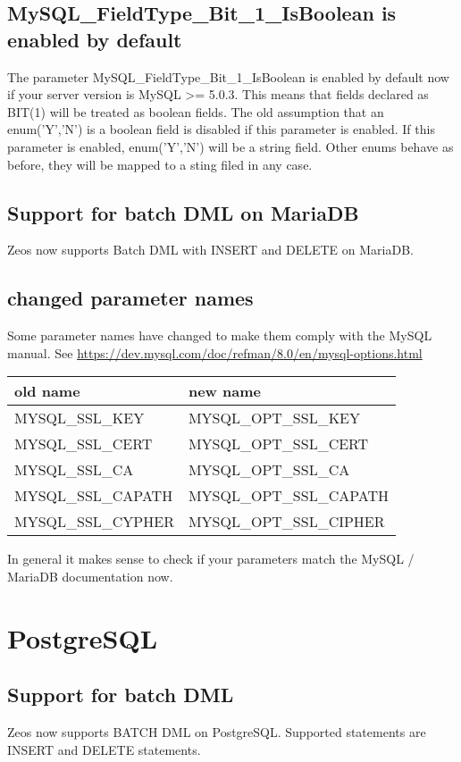 \documentclass[a4paper,12pt,oneside]{article}
\begin{document}
\subsection{MySQL\_FieldType\_Bit\_1\_IsBoolean is enabled by default}

The parameter MySQL\_FieldType\_Bit\_1\_IsBoolean is enabled by default now if your server version is MySQL >= 5.0.3.
This means that fields declared as BIT(1) will be treated as boolean fields.
The old assumption that an enum('Y','N') is a boolean field is disabled if this parameter is enabled.
If this parameter is enabled, enum('Y','N') will be a string field.
Other enums behave as before, they will be mapped to a sting filed in any case.

\subsection{Support for batch DML on MariaDB}
Zeos now supports Batch DML with INSERT and DELETE on MariaDB.

\subsection{changed parameter names}
Some parameter names have changed to make them comply with the MySQL manual.
See \url{https://dev.mysql.com/doc/refman/8.0/en/mysql-options.html}

\begin{tabular}{ll}
	old name & new name \\ \hline
  MYSQL\_SSL\_KEY & MYSQL\_OPT\_SSL\_KEY\\
	MYSQL\_SSL\_CERT & MYSQL\_OPT\_SSL\_CERT \\
	MYSQL\_SSL\_CA & MYSQL\_OPT\_SSL\_CA \\
	MYSQL\_SSL\_CAPATH & MYSQL\_OPT\_SSL\_CAPATH \\
	MYSQL\_SSL\_CYPHER & MYSQL\_OPT\_SSL\_CIPHER \\
\end{tabular}

In general it makes sense to check if your parameters match the MySQL / MariaDB documentation now.

\section{PostgreSQL}

\subsection{Support for batch DML}
Zeos now supports BATCH DML on PostgreSQL. 
Supported statements are INSERT and DELETE statements.
\end{document}
